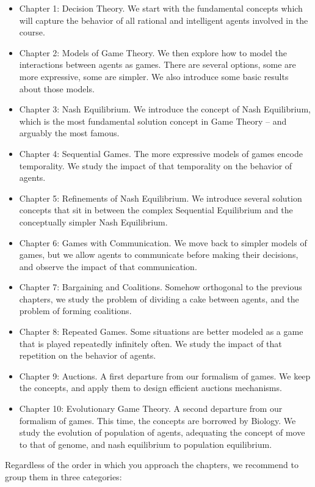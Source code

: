 \begin{itemize}
   \item Chapter 1: Decision Theory. We start with the fundamental concepts which will capture the behavior of all rational and intelligent agents involved in the course.
   \item Chapter 2: Models of Game Theory. We then explore how to model the interactions between agents as games. There are several options, some are more expressive, some are simpler. 
   		  We also introduce some basic results about those models.
    \item Chapter 3: Nash Equilibrium. We introduce the concept of Nash Equilibrium, which is the most fundamental solution concept in Game Theory -- and arguably the most famous.
    \item Chapter 4: Sequential Games. The more expressive models of games encode temporality. We study the impact of that temporality on the behavior of agents.
    \item Chapter 5: Refinements of Nash Equilibrium. We introduce several solution concepts that sit in between the complex Sequential Equilibrium and the conceptually simpler Nash Equilibrium.
    \item Chapter 6: Games with Communication. We move back to simpler models of games, but we allow agents to communicate before making their decisions, and observe the impact of that communication.
    \item Chapter 7: Bargaining and Coalitions. Somehow orthogonal to the previous chapters, we study the problem of dividing a cake between agents, and the problem of forming coalitions.
    \item Chapter 8: Repeated Games. Some situations are better modeled as a game that is played repeatedly infinitely often. We study the impact of that repetition on the behavior of agents.
    \item Chapter 9: Auctions. A first departure from our formalism of games. We keep the concepts, and apply them to design efficient auctions mechanisms.
    \item Chapter 10: Evolutionary Game Theory. A second departure from our formalism of games. This time, the concepts are borrowed by Biology. We study the evolution of population of agents, adequating the concept of move to that of genome, and nash equilibrium to population equilibrium.
\end{itemize}

Regardless of the order in which you approach the chapters, we recommend to group them in three categories:

